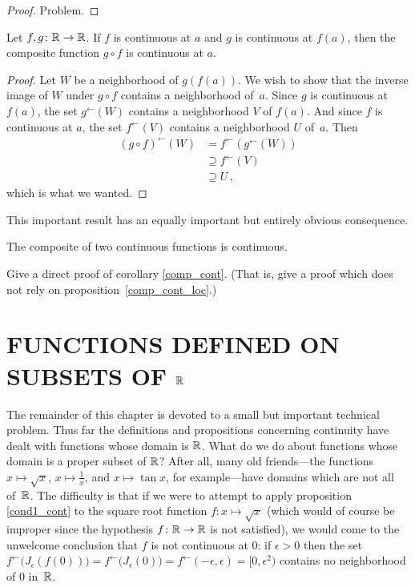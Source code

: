 \begin{proof} Problem.  \ns \end{proof}

\begin{prop}\label{comp_cont_loc} Let $f,g\colon\mathbb{R} \rightarrow \mathbb{R}$. If $f$ is continuous at $a$ and
$g$ is continuous at $f(a)$, then the composite function $g \circ f$ is continuous at $a$.
\end{prop}

\begin{proof} Let $W$ be a neighborhood of $g(f(a))$.  We wish to show that the inverse image
of $W$ under $g \circ f$ contains a neighborhood of~$a$.  Since $g$ is continuous at $f(a)$,
the set $g^\gets(W)$ contains a neighborhood $V$ of $f(a)$.  And since $f$ is continuous at
$a$, the set $f^\gets(V)$ contains a neighborhood $U$ of~$a$.  Then
 \begin{align*}
   (g \circ f)^\gets(W) &= f^\gets(g^\gets(W)) \\
                             &\supseteq f^\gets(V) \\
                             &\supseteq U\,,
 \end{align*}
which is what we wanted.
\end{proof}

This important result has an equally important but entirely obvious consequence.

\begin{cor}\label{comp_cont} The composite of two continuous functions is continuous.
\end{cor}

\begin{prob} Give a direct proof of corollary \ref{comp_cont}.  (That is, give a proof which
does not rely on proposition~\ref{comp_cont_loc}.)
\end{prob}









\section{FUNCTIONS DEFINED ON SUBSETS OF $\mathbb{R}$}
The remainder of this chapter is devoted to a small but important technical problem.  Thus far
the definitions and propositions concerning continuity have dealt with functions whose domain
is $\mathbb{R}$.  What do we do about functions whose domain is a proper subset of $\mathbb{R}$?  After all,
many old friends---the functions $x \mapsto \sqrt x$, $x \mapsto \frac1x$, and $x \mapsto \tan
x$, for example---have domains which are not all of~$\mathbb{R}$.  The difficulty is that if we were
to attempt to apply proposition \ref{cond1_cont} to the square root function $f\colon x
\mapsto \sqrt x$ (which would of course be improper since the hypothesis $f\colon\mathbb{R} \rightarrow \mathbb{R}$
is not satisfied), we would come to the unwelcome conclusion that $f$ is not continuous at
$0$: if $\epsilon > 0$ then the set $f^\gets\bigl(J_\epsilon(f(0))\bigr) =
f^\gets\bigl(J_\epsilon(0)\bigr) = f^\gets(-\epsilon,\epsilon) = [0,{\epsilon}^2)$ contains no
neighborhood of $0$ in~$\mathbb{R}$.

